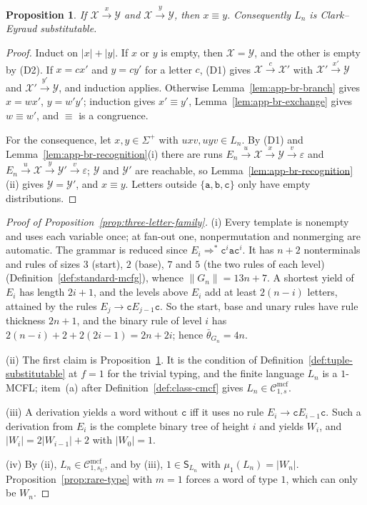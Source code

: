 \documentclass[11pt]{article}
\numberwithin{equation}{section}
\theoremstyle{plain}
\newtheorem{proposition}[theorem]{Proposition}
\theoremstyle{definition}
\theoremstyle{remark}
\newcommand{\Cmcf}[2]{\mathcal{C}^{\mathrm{mcf}}_{#1,#2}}
\newcommand{\eps}{\varepsilon}
\theoremstyle{plain}
\begin{document}
\begin{proposition}\label{prop:app-br-congruence}
\label{prop:app-tl-congruence}
If $\mathcal X\xrightarrow{x}\mathcal Y$ and $\mathcal X\xrightarrow{y}\mathcal Y$, then $x\equiv y$.
Consequently $L_n$ is Clark--Eyraud substitutable.
\end{proposition}

\begin{proof}
Induct on $|x|+|y|$.  If $x$ or $y$ is empty, then $\mathcal X=\mathcal Y$, and the
other is empty by (D2).  If $x=cx'$ and $y=cy'$ for a letter $c$, (D1) gives
$\mathcal X\xrightarrow{c}\mathcal X'$ with $\mathcal X'\xrightarrow{x'}\mathcal Y$ and
$\mathcal X'\xrightarrow{y'}\mathcal Y$, and induction applies.  Otherwise
Lemma~\ref{lem:app-br-branch} gives $x=wx'$, $y=w'y'$; induction gives
$x'\equiv y'$, Lemma~\ref{lem:app-br-exchange} gives $w\equiv w'$, and $\equiv$ is a
congruence.

For the consequence, let $x,y\in\Sigma^+$ with $uxv,uyv\in L_n$.  By (D1) and
Lemma~\ref{lem:app-br-recognition}(i) there are runs
$E_n\xrightarrow{u}\mathcal X\xrightarrow{x}\mathcal Y\xrightarrow{v}\eps$ and
$E_n\xrightarrow{u}\mathcal X\xrightarrow{y}\mathcal Y'\xrightarrow{v}\eps$; $\mathcal Y$ and
$\mathcal Y'$ are reachable, so Lemma~\ref{lem:app-br-recognition}(ii) gives
$\mathcal Y=\mathcal Y'$, and $x\equiv y$.  Letters outside $\{\mathtt a,\mathtt b,\mathtt c\}$
only have empty distributions.
\end{proof}

\begin{proof}[Proof of Proposition~\ref{prop:three-letter-family}]
(i) Every template is nonempty and uses each variable once; at fan-out one,
nonpermutation and nonmerging are automatic.  The grammar is reduced since
$E_i\Rightarrow^*\mathtt c^i\mathtt a\mathtt c^i$.  It has $n+2$ nonterminals and
rules of sizes $3$ (start), $2$ (base), $7$ and $5$ (the two rules of each level)
(Definition~\ref{def:standard-mcfg}), whence $\|G_n\|=13n+7$.  A shortest yield
of $E_i$ has length $2i+1$, and the levels above $E_i$ add at least $2(n-i)$
letters, attained by the rules $E_j\to\mathtt cE_{j-1}\mathtt c$.  So the start, base
and unary rules have rule thickness $2n+1$, and the binary rule of level $i$ has
$2(n-i)+2+2(2i-1)=2n+2i$; hence $\bar\theta_{G_n}=4n$.

(ii) The first claim is Proposition~\ref{prop:app-br-congruence}.  It is the
condition of Definition~\ref{def:tuple-substitutable} at $f=1$ for the trivial
typing, and the finite language $L_n$ is a $1$-MCFL; item~(a) after
Definition~\ref{def:class-cmcf} gives $L_n\in\Cmcf{1}{s}$.

(iii) A derivation yields a word without $\mathtt c$ iff it uses no rule
$E_i\to\mathtt cE_{i-1}\mathtt c$.  Such a derivation from $E_i$ is the complete binary
tree of height $i$ and yields $W_i$, and $|W_i|=2|W_{i-1}|+2$ with $|W_0|=1$.

(iv) By (ii), $L_n\in\Cmcf{1}{s_U}$, and by (iii), $1\in \mathsf S_{L_n}$ with
$\mu_1(L_n)=|W_n|$.  Proposition~\ref{prop:rare-type} with $m=1$ forces a word of
type $1$, which can only be $W_n$.
\end{proof}
\end{document}
